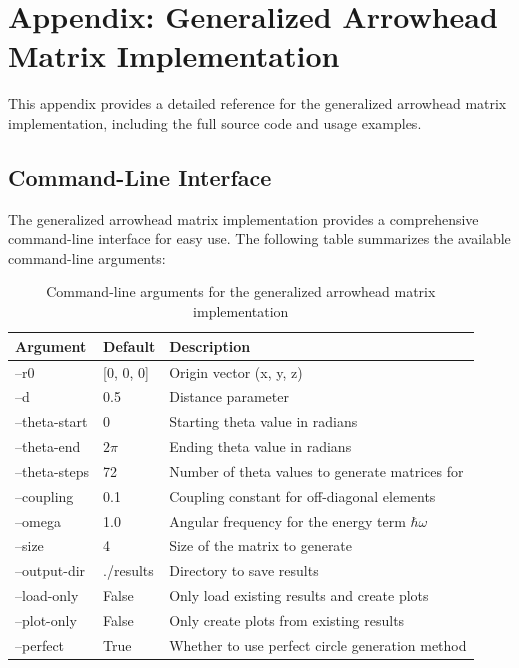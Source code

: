 \newpage
\section{Appendix: Generalized Arrowhead Matrix Implementation}

This appendix provides a detailed reference for the generalized arrowhead matrix implementation, including the full source code and usage examples.

\subsection{Command-Line Interface}

The generalized arrowhead matrix implementation provides a comprehensive command-line interface for easy use. The following table summarizes the available command-line arguments:

\begin{table}[H]
    \centering
    \begin{tabular}{|l|l|p{8cm}|}
        \hline
        \textbf{Argument} & \textbf{Default} & \textbf{Description} \\
        \hline
        --r0 & [0, 0, 0] & Origin vector (x, y, z) \\
        --d & 0.5 & Distance parameter \\
        --theta-start & 0 & Starting theta value in radians \\
        --theta-end & $2\pi$ & Ending theta value in radians \\
        --theta-steps & 72 & Number of theta values to generate matrices for \\
        --coupling & 0.1 & Coupling constant for off-diagonal elements \\
        --omega & 1.0 & Angular frequency for the energy term $\hbar\omega$ \\
        --size & 4 & Size of the matrix to generate \\
        --output-dir & ./results & Directory to save results \\
        --load-only & False & Only load existing results and create plots \\
        --plot-only & False & Only create plots from existing results \\
        --perfect & True & Whether to use perfect circle generation method \\
        \hline
    \end{tabular}
    \caption{Command-line arguments for the generalized arrowhead matrix implementation}
    \label{tab:arrowhead_args}
\end{table}

